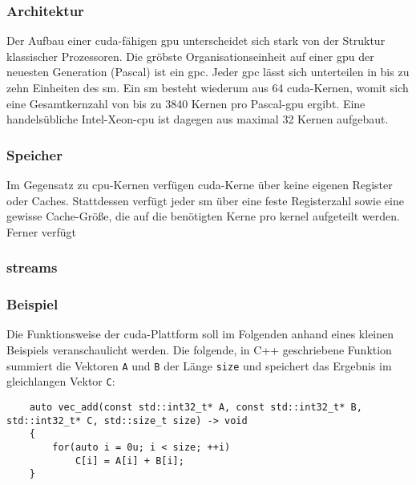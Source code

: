 \subsubsection{Architektur}\label{sssec:cu_arch}

Der Aufbau einer \gls{cuda}-fähigen \gls{gpu} unterscheidet sich stark von der Struktur klassischer Prozessoren. Die
gröbste Organisationseinheit auf einer \gls{gpu} der neuesten Generation (Pascal{\texttrademark}) ist ein \gls{gpc}.
Jeder \gls{gpc} lässt sich unterteilen in bis zu zehn Einheiten des \gls{sm}. Ein \gls{sm} besteht wiederum aus 64
\gls{cuda}-Kernen, womit sich eine Gesamtkernzahl von bis zu 3840 Kernen pro Pascal{\texttrademark}-\gls{gpu} ergibt.
Eine handelsübliche Intel{\textregistered}-Xeon{\textregistered}-\gls{cpu} ist dagegen aus maximal 32 Kernen aufgebaut.

\subsubsection{Speicher}

Im Gegensatz zu \gls{cpu}-Kernen verfügen \gls{cuda}-Kerne über keine eigenen Register oder Caches. Stattdessen verfügt
jeder \gls{sm} über eine feste Registerzahl sowie eine gewisse Cache-Größe, die auf die benötigten Kerne pro
\gls{kernel} aufgeteilt werden. Ferner verfügt

\subsubsection{\glspl{stream}}\label{sssec:cu_streams}

\subsubsection{Beispiel}\label{sssec:cu_vec_add}

Die Funktionsweise der \gls{cuda}-Plattform soll im Folgenden anhand eines kleinen Beispiels veranschaulicht werden. Die
folgende, in C++ geschriebene Funktion summiert die Vektoren \texttt{A} und \texttt{B} der Länge \texttt{size} und
speichert das Ergebnis im gleichlangen Vektor \texttt{C}:

\begin{verbatim}
    auto vec_add(const std::int32_t* A, const std::int32_t* B, std::int32_t* C, std::size_t size) -> void
    {
        for(auto i = 0u; i < size; ++i)
            C[i] = A[i] + B[i];
    }
\end{verbatim}

